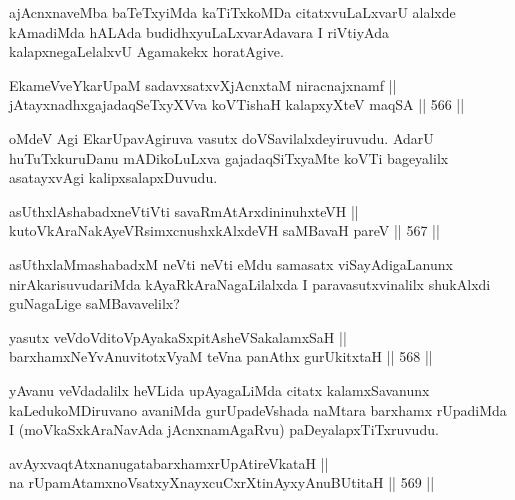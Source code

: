 \begin{artha}
ajAcnxnaveMba baTeTxyiMda kaTiTxkoMDa citatxvuLaLxvarU alalxde
kAmadiMda hALAda budidhxyuLaLxvarAdavara I riVtiyAda
kalapxnegaLelalxvU Agamakekx horatAgive.
\end{artha}

\begin{shl}
EkameVveYkarUpaM sadavxsatxvXjAcnxtaM niracnajxnamf || \\
jAtayxnadhxgajadaqSeTxyXVva koVTishaH kalapxyXteV maqSA \hfill || 566 ||  
\end{shl}

\begin{artha}
oMdeV Agi EkarUpavAgiruva vasutx doVSavilalxdeyiruvudu. AdarU
huTuTxkuruDanu mADikoLuLxva gajadaqSiTxyaMte koVTi bageyalilx
asatayxvAgi kalipxsalapxDuvudu.
\end{artha}


\begin{shl}
asUthxlAshabadxneVtiVti savaRmAtArxdininuhxteVH || \\
kutoV\s kAraNakAyeVR\s simxcnushxkAlxdeVH saMBavaH pareV \hfill || 567 ||  
\end{shl}

\begin{artha}
asUthxlaMmashabadxM neVti neVti eMdu samasatx viSayAdigaLanunx
nirAkarisuvudariMda kAyaRkAraNagaLilalxda I paravasutxvinalilx\break
shukAlxdi guNagaLige saMBavavelilx?
\end{artha}


\begin{shl}
yasutx veVdoVditoVpAyakaSxpitAsheVSakalamxSaH || \\
barxhamxNeYvAnuvitotxV\s yaM teVna panAthx gurUkitxtaH \hfill || 568 ||  
\end{shl}

\begin{artha}
yAvanu veVdadalilx heVLida upAyagaLiMda citatx kalamxSavanunx
kaLedukoMDiruvano avaniMda gurUpadeVshada naMtara barxhamx rUpadiMda
I (moVkaSxkAraNavAda jAcnxnamAgaRvu) paDeyalapxTiTxruvudu.
\end{artha}

\begin{shl}
avAyxvaqtAtxnanugatabarxhamxrUpAtireVkataH || \\
na rUpamAtamxnoV\s satxyXnayxcuCxrXtinAyxyAnuBUtitaH \hfill || 569 ||  
\end{shl}

